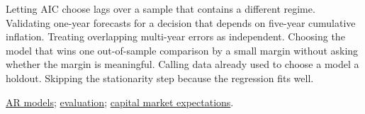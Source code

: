\begin{qfmethod}
 Letting AIC choose lags over a sample that contains a different regime. Validating one-year forecasts for a decision that depends on five-year cumulative inflation. Treating overlapping multi-year errors as independent. Choosing the model that wins one out-of-sample comparison by a small margin without asking whether the margin is meaningful. Calling data already used to choose a model a holdout. Skipping the stationarity step because the regression fits well.

 \hyperref[meth:autoregressive-forecasting]{AR models}; \hyperref[meth:forecast-accuracy-evaluation]{evaluation}; \hyperref[meth:cme-framework-forecasting]{capital market expectations}.

\end{qfmethod}
